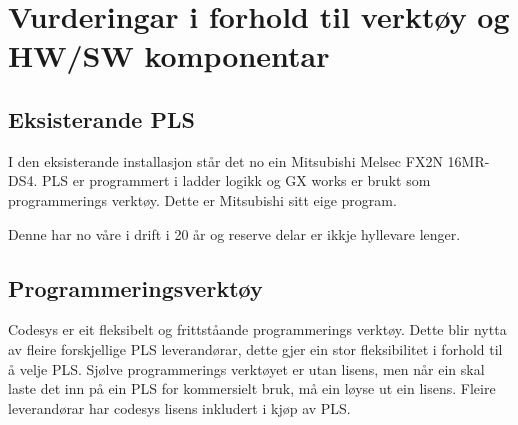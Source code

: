 \section{Vurderingar i forhold til verktøy og HW/SW komponentar}

\subsection{Eksisterande PLS}
I den eksisterande installasjon står det no ein Mitsubishi Melsec FX2N 16MR-DS4.
PLS er programmert i ladder logikk og GX works er brukt som programmerings verktøy.
Dette er Mitsubishi sitt eige program.

Denne har no våre i drift i 20 år og reserve delar er ikkje hyllevare lenger.

\subsection{Programmeringsverktøy}
Codesys er eit fleksibelt og frittståande programmerings verktøy. 
Dette blir nytta av fleire forskjellige PLS leverandørar, 
dette gjer ein stor fleksibilitet i forhold til å velje PLS. 
Sjølve programmerings verktøyet er utan lisens, 
men når ein skal laste det inn på ein PLS for kommersielt bruk, må ein løyse ut ein lisens. 
Fleire leverandørar har codesys lisens inkludert i kjøp av PLS.